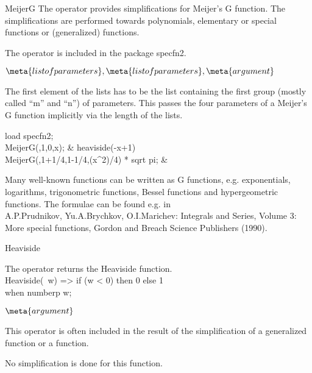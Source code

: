 \begin{Operator}{MeijerG}
The  operator provides simplifications for Meijer's G  
function. The simplifications are performed towards polynomials,
elementary or
special functions or (generalized)  functions.

The  operator is included in the package specfn2.

\begin{Syntax}
\(\meta{list of parameters},\meta{list of parameters},
   \meta{argument}\)
\end{Syntax}
The first element of the lists has to be the list containing the
first group (mostly called ``m'' and ``n'') of parameters. This passes
the  four parameters of a Meijer's G function implicitly via the
length of the lists.

\begin{Examples}
load specfn2;\\
MeijerG({{},1},{{0}},x);       &   heaviside(-x+1)\\
MeijerG({{}},{{1+1/4},1-1/4},(x^2)/4) * sqrt pi;
		& 
\end{Examples}

\begin{Comments}
Many well-known functions can be written as G functions,
e.g. exponentials, logarithms, trigonometric functions, Bessel functions
and hypergeometric functions.
The formulae can be found e.g. in \\
A.P.Prudnikov, Yu.A.Brychkov, O.I.Marichev: 
Integrals and Series, Volume 3: More special functions,
Gordon and Breach Science Publishers (1990).
\end{Comments}
\end{Operator}

\begin{Operator}{Heaviside}

The  operator returns the Heaviside function. \\

Heaviside(~w) => if (w < 0) then 0 else 1 \\
    when numberp w;

\begin{Syntax}
\(\meta{argument}\)
\end{Syntax}

\begin{Comments}
This operator is often included in the result of the simplification
of a generalized  function or a
 function.

No simplification is done for this function.
\end{Comments}
\end{Operator}

